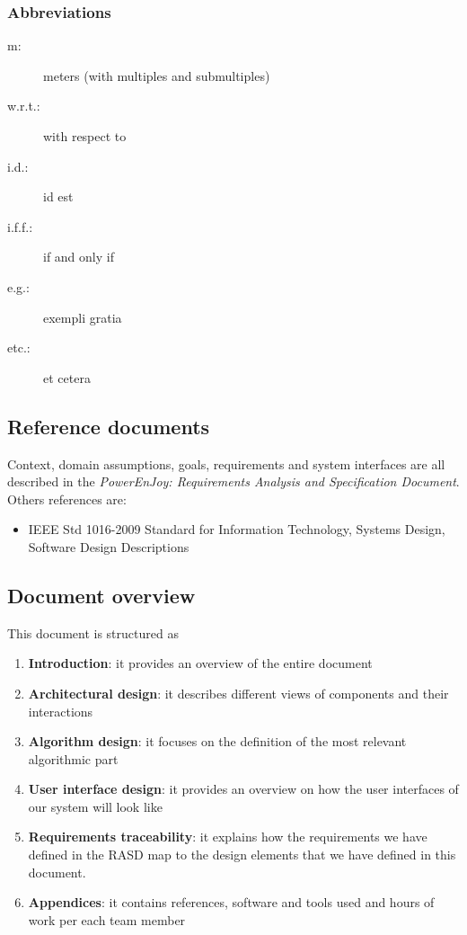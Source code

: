 \subsubsection{Abbreviations}
	\begin{description}
		\item [m:] meters (with multiples and submultiples)
		\item [w.r.t.:] with respect to
		\item [i.d.:] id est
		\item [i.f.f.:] if and only if
		\item [e.g.:] exempli gratia
		\item [etc.:] et cetera
	\end{description}

\subsection{Reference documents}
Context, domain assumptions, goals, requirements and system interfaces are all described in the \emph{PowerEnJoy: Requirements Analysis and Specification Document}.\cite{RASD}\\
Others references are:
\begin{itemize}
	\item IEEE Std 1016-2009 Standard for Information Technology, Systems Design, Software Design Descriptions
\end{itemize}

\subsection{Document overview}
This document is structured as
\begin{enumerate}
	\item \textbf{Introduction}: it provides an overview of the entire document
	\item \textbf{Architectural design}: it describes different views of components and their interactions
	\item \textbf{Algorithm design}: it focuses on the definition of the most relevant algorithmic part
	\item \textbf{User interface design}: it provides an overview on how the user interfaces of our system will look like
	\item \textbf{Requirements traceability}: it explains how the requirements we have defined in the RASD map to the design elements that we have defined in this document.
	\item \textbf{Appendices}: it contains references, software and tools used and hours of work per each team member
\end{enumerate}